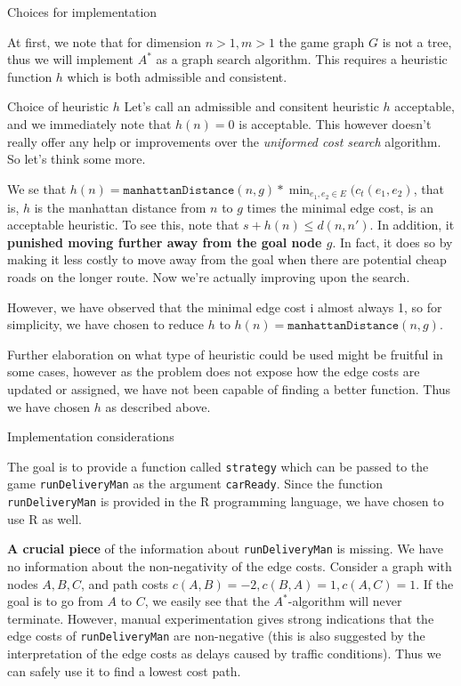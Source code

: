   \begin{subsection}{Choices for implementation}

    At first, we note that for dimension $n > 1, m > 1$ the game graph $G$ is not a tree, thus we will implement $A^*$ as a graph search algorithm. This requires a heuristic function $h$ which is both admissible and consistent.

    \begin{subsubsection}{Choice of heuristic $h$}
      Let's call an admissible and consitent heuristic $h$ acceptable, and we immediately note that $h(n) = 0$ is acceptable. This however doesn't really offer any help or improvements over the \textit{uniformed cost search} algorithm. So let's think some more.

      We se that $h(n) = \texttt{manhattanDistance}(n, g) * \min_{e_1, e_2\in E}(c_t(e_1, e_2)$, that is, $h$ is the manhattan distance from $n$ to $g$ times the minimal edge cost, is an acceptable heuristic. To see this, note that $s + h(n) \leq d(n, n')$. In addition, it \textbf{punished moving further away from the goal node $g$}. In fact, it does so by making it less costly to move away from the goal when there are potential cheap roads on the longer route. Now we're actually improving upon the search.
	  
	  However, we have observed that the minimal edge cost i almost always 1, so for simplicity, we have chosen to reduce $h$ to $h(n) = \texttt{manhattanDistance}(n, g)$.

      Further elaboration on what type of heuristic could be used might be fruitful in some cases, however as the problem does not expose how the edge costs are updated or assigned, we have not been capable of finding a better function. Thus we have chosen $h$ as described above.
    \end{subsubsection}
    
    \begin{subsubsection}{Implementation considerations}

      The goal is to provide a function called \texttt{strategy} which can be passed to the game \texttt{runDeliveryMan} as the argument \texttt{carReady}. Since the function \texttt{runDeliveryMan} is provided in the R programming language, we have chosen to use R as well. 

      \textbf{A crucial piece} of the information about \texttt{runDeliveryMan} is missing. We have no information about the non-negativity of the edge costs. Consider a graph with nodes $A, B, C$, and path costs $c(A, B) = -2, c(B, A) = 1, c(A, C) = 1$. If the goal is to go from $A$ to $C$, we easily see that the $A^*$-algorithm will never terminate. However, manual experimentation gives strong indications that the edge costs of \texttt{runDeliveryMan} are non-negative (this is also suggested by the interpretation of the edge costs as delays caused by traffic conditions). Thus we can safely use it to find a lowest cost path. 
	  

\end{subsubsection}
\end{subsection}
